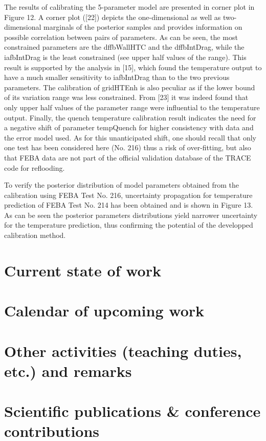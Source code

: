 \documentclass[11pt,titlepage]{article}
\begin{document}
The results of calibrating the 5-parameter model are presented in corner plot in Figure 12. A corner plot ([22]) depicts the one-dimensional as well as two-dimensional marginals of the posterior samples and provides information on possible correlation between pairs of parameters. As can be seen, the most constrained parameters are the dffbWallHTC and the dffbIntDrag, while the iafbIntDrag is the least constrained (see upper half values of the range). This result is supported by the analysis in [15], which found the temperature output to have a much smaller sensitivity to iafbIntDrag than to the two previous parameters. The calibration of gridHTEnh is also peculiar as if the lower bound of its variation range was less constrained. From [23] it was indeed found that only upper half values of the parameter range were influential to the temperature output. Finally, the quench temperature calibration result indicates the need for a negative shift of parameter tempQuench for higher consistency with data and the error model used. As for this unanticipated shift, one should recall that only one test has been considered here (No. 216) thus a risk of over-fitting, but also that FEBA data are not part of the official validation database of the TRACE code for reflooding. 



To verify the posterior distribution of model parameters obtained from the calibration using FEBA Test No. 216, uncertainty propagation for temperature prediction of FEBA Test No. 214 has been obtained and is shown in Figure 13. As can be seen the posterior parameters distributions yield narrower uncertainty for the temperature prediction, thus confirming the potential of the developped calibration method.

\section{Current state of work}

\section{Calendar of upcoming work}

\section{Other activities (teaching duties, etc.) and remarks}

\section{Scientific publications \& conference contributions}
\end{document}
